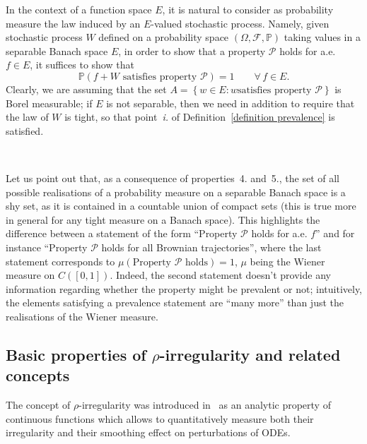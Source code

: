 \documentclass[10pt]{article}
\newcommand{\tmtextit}[1]{{\itshape{#1}}}
\begin{document}
In the context of a function space $E$, it is natural to consider as
probability measure the law induced by an $E$\mbox{-}valued stochastic
process. Namely, given stochastic process $W$ defined on a probability space
$(\Omega, \mathcal{F}, \mathbb{P})$ taking values in a separable Banach space
$E$, in order to show that a property $\mathcal{P}$ holds for a.e. $f \in E$,
it suffices to show that
\[ \mathbb{P} \left( \text{$f + W$ satisfies property $\mathcal{P}$} \right) =
   1 \qquad \forall \, f \in E. \]
Clearly, we are assuming that the set $A = \left\{ w \in E : \text{$w$
satisfies property $\mathcal{P}$} \right\}$ is Borel measurable; if $E$ is not
separable, then we need in addition to require that the law of $W$ is tight,
so that point~\tmtextit{i.} of Definition~\ref{definition prevalence} is
satisfied.

\

Let us point out that, as a consequence of properties~4. and~5., the set of
all possible realisations of a probability measure on a separable Banach space
is a shy set, as it is contained in a countable union of compact sets (this is
true more in general for any tight measure on a Banach space). This highlights
the difference between a statement of the form ``Property $\mathcal{P}$ holds
for a.e. $f$'' and for instance ``Property $\mathcal{P}$ holds for all
Brownian trajectories'', where the last statement corresponds to $\mu \left(
\text{Property $\mathcal{P}$ holds} \right) = 1$, $\mu$ being the Wiener
measure on $C ([0, 1])$. Indeed, the second statement doesn't provide any
information regarding whether the property might be prevalent or not;
intuitively, the elements satisfying a prevalence statement are ``many more''
than just the realisations of the Wiener measure.

\subsection{Basic properties of $\rho$\mbox{-}irregularity and related
concepts}\label{sec2.2}

The concept of $\rho$\mbox{-}irregularity was introduced
in~{\cite{catelliergubinelli}} as an analytic property of continuous functions
which allows to quantitatively measure both their irregularity and their
smoothing effect on perturbations of ODEs.
\end{document}
